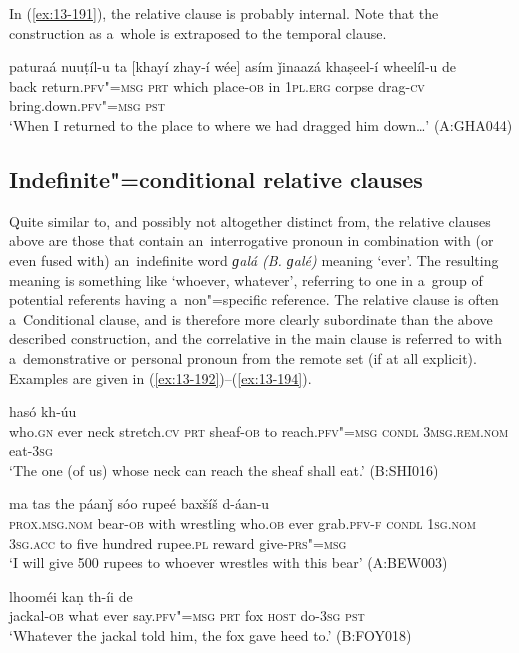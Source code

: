 In (\ref{ex:13-191}), the relative clause is probably internal. Note that the construction as a~whole is extraposed to the temporal clause.

\begin{exe}
\ex
\label{ex:13-191}
\gll paturaá nuuṭíl-u ta [khayí zhay-í wée] asím  ǰinaazá khaṣeel-í wheelíl-u de \\
back return.\textsc{pfv"=msg} \textsc{prt} which place-\textsc{ob} in \textsc{1pl.erg} corpse drag-\textsc{cv}  bring.down.\textsc{pfv"=msg} \textsc{pst}   \\
\glt `When I returned to the place to where we had dragged him down{\ldots}' (A:GHA044)
\end{exe}

\subsection{Indefinite"=conditional relative clauses}
\label{subsec:13-6-2}

Quite similar to, and possibly not altogether distinct from, the relative clauses above are those that contain an~interrogative pronoun in combination with (or even fused with) an~indefinite word \textit{ɡalá} \textit{(B. ɡalé)} meaning `ever'. The resulting meaning is something like `whoever, whatever', referring to one in a~group of potential referents having a~non"=specific reference. The relative clause is often a~Conditional clause, and is therefore more clearly subordinate than the above described construction, and the correlative in the main clause is referred to with a~demonstrative or personal pronoun from the remote set (if at all explicit). Examples are given in (\ref{ex:13-192})--(\ref{ex:13-194}).

\begin{exe}
\ex
\label{ex:13-192}
 hasó kh-úu \\
who.\textsc{gn} ever neck stretch.\textsc{cv} \textsc{prt} sheaf-\textsc{ob} to  reach.\textsc{pfv"=msg} \textsc{condl} \textsc{3msg.rem.nom} eat-\textsc{3sg} \\
\glt `The one (of us) whose neck can reach the sheaf shall eat.' (B:SHI016)

\ex
\label{ex:13-193}
 ma tas
the páanǰ sóo rupeé baxšíš  d-áan-u \\
\textsc{prox.msg.nom}{\protect\footnotemark} bear-\textsc{ob} with wrestling who.\textsc{ob} ever grab.\textsc{pfv-f} \textsc{condl} \textsc{1sg.nom} \textsc{3sg.acc} to five hundred rupee.\textsc{pl} reward give-\textsc{prs"=msg} \\
\glt `I will give 500 rupees to whoever wrestles with this bear' (A:BEW003)

\ex
\label{ex:13-194}
 lhooméi kaṇ  th-íi de \\
jackal-\textsc{ob} what ever say.\textsc{pfv"=msg} \textsc{prt} fox \textsc{host} do-\textsc{3sg} \textsc{pst} \\
\glt `Whatever the jackal told him, the fox gave heed to.' (B:FOY018) 
\end{exe}

